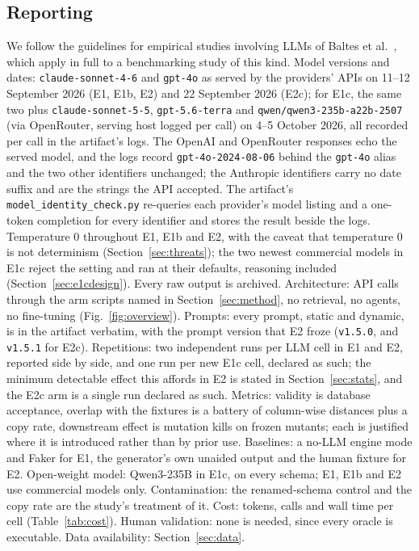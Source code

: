 \documentclass[preprint,12pt]{elsarticle}
\begin{document}
\subsection{Reporting}
\label{sec:reporting}
We follow the guidelines for empirical studies involving LLMs of Baltes et al.~\cite{baltes2026guidelines,wagner2025towards}, which apply in full to a benchmarking study of this kind. Model versions and dates: \texttt{claude-sonnet-4-6} and \texttt{gpt-4o} as served by the providers' APIs on 11--12 September 2026 (E1, E1b, E2) and 22 September 2026 (E2c); for E1c, the same two plus \texttt{claude-sonnet-5-5}, \texttt{gpt-5.6-terra} and \texttt{qwen/qwen3-235b-a22b-2507} (via OpenRouter, serving host logged per call) on 4--5 October 2026, all recorded per call in the artifact's logs. The OpenAI and OpenRouter responses echo the served model, and the logs record \texttt{gpt-4o-2024-08-06} behind the \texttt{gpt-4o} alias and the two other identifiers unchanged; the Anthropic identifiers carry no date suffix and are the strings the API accepted. The artifact's \texttt{model\_identity\_check.py} re-queries each provider's model listing and a one-token completion for every identifier and stores the result beside the logs. Temperature 0 throughout E1, E1b and E2, with the caveat that temperature 0 is not determinism (Section~\ref{sec:threats}); the two newest commercial models in E1c reject the setting and ran at their defaults, reasoning included (Section~\ref{sec:e1cdesign}). Every raw output is archived. Architecture: API calls through the arm scripts named in Section~\ref{sec:method}, no retrieval, no agents, no fine-tuning (Fig.~\ref{fig:overview}). Prompts: every prompt, static and dynamic, is in the artifact verbatim, with the prompt version that E2 froze (\texttt{v1.5.0}, and \texttt{v1.5.1} for E2c). Repetitions: two independent runs per LLM cell in E1 and E2, reported side by side, and one run per new E1c cell, declared as such; the minimum detectable effect this affords in E2 is stated in Section~\ref{sec:stats}, and the E2c arm is a single run declared as such. Metrics: validity is database acceptance, overlap with the fixtures is a battery of column-wise distances plus a copy rate, downstream effect is mutation kills on frozen mutants; each is justified where it is introduced rather than by prior use. Baselines: a no-LLM engine mode and Faker for E1, the generator's own unaided output and the human fixture for E2. Open-weight model: Qwen3-235B in E1c, on every schema; E1, E1b and E2 use commercial models only. Contamination: the renamed-schema control and the copy rate are the study's treatment of it. Cost: tokens, calls and wall time per cell (Table~\ref{tab:cost}). Human validation: none is needed, since every oracle is executable. Data availability: Section~\ref{sec:data}.
\end{document}
